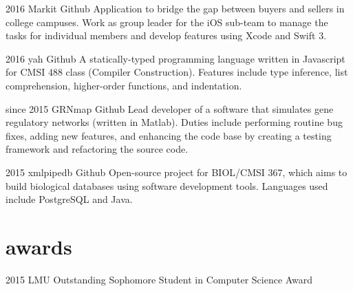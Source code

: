 \documentclass[]{friggeri-cv} %
\begin{document}
  \begin{entrylist}

    \entry
      {2016}
      {Markit}
      {Github}
      {Application to bridge the gap between buyers and sellers in college campuses. Work as group leader for the iOS sub-team to manage the tasks for individual members and develop features using Xcode and Swift 3.}

    
    \entry
      {2016}
      {yah}
      {Github}
      {A statically-typed programming language written in Javascript for CMSI 488 class (Compiler Construction). Features include type inference, list comprehension, higher-order functions, and indentation.}


    \entry
      {since 2015}
      {GRNmap}
      {Github}
      {Lead developer of a software that simulates gene regulatory networks (written in Matlab). Duties include performing routine bug fixes, adding new features, and enhancing the code base by creating a testing framework and refactoring the source code.}


    \entry
      {2015}
      {xmlpipedb}
      {Github}
      {Open-source project for BIOL/CMSI 367, which aims to build biological databases using software development tools. Languages used include PostgreSQL and Java.}

  
  \end{entrylist}


\section{awards}

  \begin{entrylist}
  

    \shortentry
      {2015}
      {LMU Outstanding Sophomore Student in Computer Science Award}
      
            
  \end{entrylist}
\end{document}
